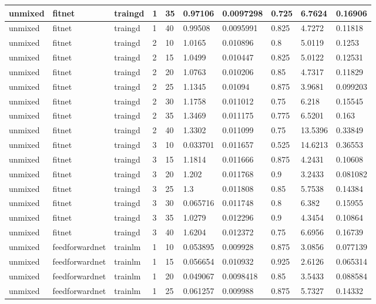 \begin{longtable}{lllllllll}
unmixed & fitnet & traingd & 1 & 35 & 0.97106 & 0.0097298 & 0.725 & 6.7624 & 0.16906 \\ \hline 
unmixed & fitnet & traingd & 1 & 40 & 0.99508 & 0.0095991 & 0.825 & 4.7272 & 0.11818 \\ \hline 
unmixed & fitnet & traingd & 2 & 10 & 1.0165 & 0.010896 & 0.8 & 5.0119 & 0.1253 \\ \hline 
unmixed & fitnet & traingd & 2 & 15 & 1.0499 & 0.010447 & 0.825 & 5.0122 & 0.12531 \\ \hline 
unmixed & fitnet & traingd & 2 & 20 & 1.0763 & 0.010206 & 0.85 & 4.7317 & 0.11829 \\ \hline 
unmixed & fitnet & traingd & 2 & 25 & 1.1345 & 0.01094 & 0.875 & 3.9681 & 0.099203 \\ \hline 
unmixed & fitnet & traingd & 2 & 30 & 1.1758 & 0.011012 & 0.75 & 6.218 & 0.15545 \\ \hline 
unmixed & fitnet & traingd & 2 & 35 & 1.3469 & 0.011175 & 0.775 & 6.5201 & 0.163 \\ \hline 
unmixed & fitnet & traingd & 2 & 40 & 1.3302 & 0.011099 & 0.75 & 13.5396 & 0.33849 \\ \hline 
unmixed & fitnet & traingd & 3 & 10 & 0.033701 & 0.011657 & 0.525 & 14.6213 & 0.36553 \\ \hline 
unmixed & fitnet & traingd & 3 & 15 & 1.1814 & 0.011666 & 0.875 & 4.2431 & 0.10608 \\ \hline 
unmixed & fitnet & traingd & 3 & 20 & 1.202 & 0.011768 & 0.9 & 3.2433 & 0.081082 \\ \hline 
unmixed & fitnet & traingd & 3 & 25 & 1.3 & 0.011808 & 0.85 & 5.7538 & 0.14384 \\ \hline 
unmixed & fitnet & traingd & 3 & 30 & 0.065716 & 0.011748 & 0.8 & 6.382 & 0.15955 \\ \hline 
unmixed & fitnet & traingd & 3 & 35 & 1.0279 & 0.012296 & 0.9 & 4.3454 & 0.10864 \\ \hline 
unmixed & fitnet & traingd & 3 & 40 & 1.6204 & 0.012372 & 0.75 & 6.6956 & 0.16739 \\ \hline 
unmixed & feedforwardnet & trainlm & 1 & 10 & 0.053895 & 0.009928 & 0.875 & 3.0856 & 0.077139 \\ \hline 
unmixed & feedforwardnet & trainlm & 1 & 15 & 0.056654 & 0.010932 & 0.925 & 2.6126 & 0.065314 \\ \hline 
unmixed & feedforwardnet & trainlm & 1 & 20 & 0.049067 & 0.0098418 & 0.85 & 3.5433 & 0.088584 \\ \hline 
unmixed & feedforwardnet & trainlm & 1 & 25 & 0.061257 & 0.009988 & 0.875 & 5.7327 & 0.14332 \\ \hline 

\end{longtable}
